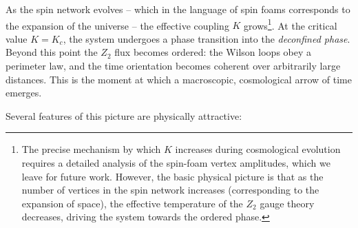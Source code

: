 \documentclass[preprint]{SciPost}
\theoremstyle{plain} %
\begin{document}
As the spin network evolves -- which in the language of spin foams corresponds to the expansion of the universe -- the effective coupling $ K $ grows\footnote{The precise mechanism by which $ K $ increases during cosmological evolution requires a detailed analysis of the spin-foam vertex amplitudes, which we leave for future work. However, the basic physical picture is that as the number of vertices in the spin network increases (corresponding to the expansion of space), the effective temperature of the $ Z_2 $ gauge theory decreases, driving the system towards the ordered phase.}. At the critical value $ K = K_c $, the system undergoes a phase transition into the \emph{deconfined phase}. Beyond this point the $ Z_2 $ flux becomes ordered: the Wilson loops obey a perimeter law, and the time orientation becomes coherent over arbitrarily large distances. This is the moment at which a macroscopic, cosmological arrow of time emerges.

Several features of this picture are physically attractive:
\end{document}
